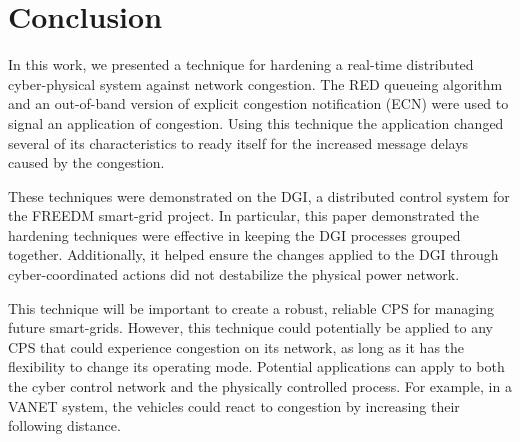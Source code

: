 
\section{Conclusion}
\label{sect:conclusion}

In this work, we presented a technique for hardening a real-time distributed cyber-physical system against network congestion.
The \ac{RED} queueing algorithm and an out-of-band version of explicit congestion notification (ECN) were used to signal an application of congestion.
Using this technique the application changed several of its characteristics to ready itself for the increased message delays caused by the congestion.

These techniques were demonstrated on the \ac{DGI}, a distributed control system for the \ac{FREEDM} smart-grid project.
In particular, this paper demonstrated the hardening techniques were effective in keeping the \ac{DGI} processes grouped together.
Additionally, it helped ensure the changes applied to the \ac{DGI} through cyber-coordinated actions did not destabilize the physical power network.

This technique will be important to create a robust, reliable \ac{CPS} for managing future smart-grids.
However, this technique could potentially be applied to any \ac{CPS} that could experience congestion on its network, as long as it has the flexibility to change its operating mode.
Potential applications can apply to both the cyber control network and the physically controlled process.
For example, in a \ac{VANET} system, the vehicles could react to congestion by increasing their following distance.
